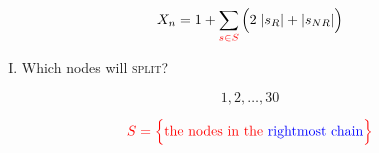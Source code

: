 
\begin{frame}{}
  \[
    X_{n} = 1 + \sum_{\textcolor{red}{s \in S}} \Big( 2\; |s_{R}| + |s_{NR}| \Big)
  \]
  
  \begin{enumerate}[(I)]
    \centering
    \item Which nodes will \textsc{split}? \\[15pt]
  \end{enumerate}

  \pause
  \[
    1, 2, \dots, 30
  \]

  \[
    \textcolor{red}{S = \Big\{ \text{the nodes in the \textcolor{blue}{rightmost chain}} \Big\}}
  \]
\end{frame}
